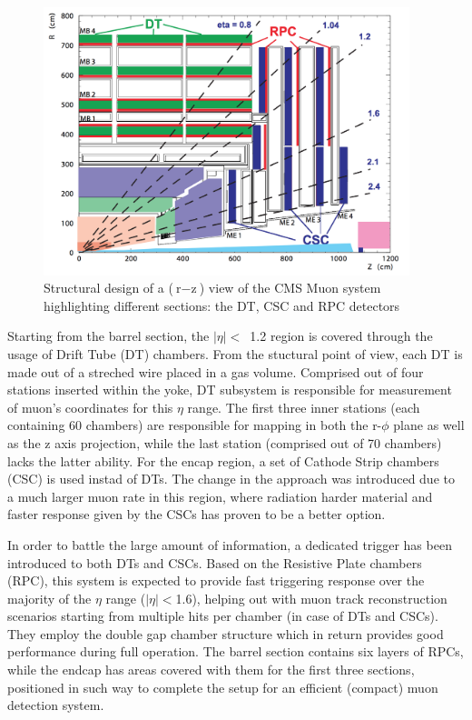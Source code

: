 \begin{figure}[htbp]
  \centering
    \includegraphics[width=0.95\textwidth]{CMS_experiment/Muon_chambers.png}
  \caption[Structural design of a ($\text{r}-\text{z}$) slice of the CMS Muon system highlighting different subsystems: the DT, CSC and RPC detectors.]{Structural design of a ($\text{r}-\text{z}$) view of the CMS Muon system highlighting different sections: the DT, CSC and RPC detectors~\cite{cms:tdr}}
  \label{fig:muon_chambers}
\end{figure}

\hspace{10pt} Starting from the barrel section, the $|\eta|<$~1.2 region is covered through the usage of Drift Tube (DT) chambers. From the stuctural point of view, each DT is made out of a streched wire placed in a gas volume. Comprised out of four stations inserted within the yoke, DT subsystem is responsible for measurement of muon's coordinates for this $\eta$ range. The first three inner stations (each containing 60 chambers) are responsible for mapping in both the r-$\phi$ plane as well as the z axis projection, while the last station (comprised out of 70 chambers) lacks the latter ability. For the encap region, a set of Cathode Strip chambers (CSC) is used instad of DTs. The change in the approach was introduced due to a much larger muon rate in this region, where radiation harder material and faster response given by the CSCs has proven to be a better option. 

\hspace{10pt} In order to battle the large amount of information, a dedicated trigger has been introduced to both DTs and CSCs. Based on the Resistive Plate chambers (RPC), this system is expected to provide fast triggering response over the majority of the $\eta$ range ($|\eta|<$1.6), helping out with muon track reconstruction scenarios starting from multiple hits per chamber (in case of DTs and CSCs). They employ the double gap chamber structure which in return provides good performance during full operation. The barrel section contains six layers of RPCs, while the endcap has areas covered with them for the first three sections, positioned in such way to complete the setup for an efficient (compact) muon detection system. 








